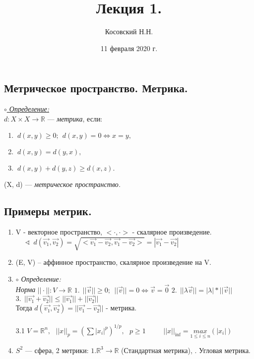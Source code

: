 \documentclass{article}
\title{Лекция 1.}
\author{Косовский Н.Н.}
\date{11 февраля 2020 г.}
\begin{document}
 \begin{spacing}{1.5}
\maketitle
\newpage
     
    \tableofcontents
    \newpage
\section{Метрическое пространство. Метрика.}
\underline{\textit{$\circ$ Определение:}}\\

  $d: X \times X\rightarrow \mathbb{R}$ --- \emph{\textit{метрика}}, если:
 \begin{enumerate}
\item $~d\left( x, y\right)\geq 0;~~ d\left( x, y\right) = 0\Longleftrightarrow x=y ,$
\item $~d\left( x, y\right)=d\left( y, x\right) ,$
\item $~d\left( x, y\right)+d\left( y, z\right)\geq d(x, z) .$

\end{enumerate}
 (X, d) --- \textit{метрическое пространство.}
 \\
 \subsection{Примеры метрик.}

 \begin{enumerate}
\item V - векторное пространство, $<\cdot , \cdot >$ - скалярное произведение.
 \\$ ~~~~~~\sphericalangle ~~d(\vec{v_{1}}, \vec{v_{2}}) = \sqrt{<\vec{v_{1}} - \vec{v_{2}},\vec{v_{1}} - \vec{v_{2}}> } = |\vec{v_{1}} - \vec{v_{2}}|$
 \item (E, V) -- аффинное пространство, скалярное произведение на V.
 \item \emph{$\circ$ Определение:}\\
 \emph{Норма }$||\cdot||: V\rightarrow  \mathbb{R}$
 \subitem $1. ~~||\vec{v}||\geq 0 ; ~~||\vec{v}|| = 0 \Longleftrightarrow \vec{v} = \vec{0} $
 \subitem $ 2. ~~||\lambda\vec{v}|| = |\lambda|*||\vec{v}|| $
 \subitem $ 3.~~||\vec{v_{1}} + \vec{v_{2}} ||\leq || \vec{v_{1}} || + ||\vec{v_{2}}||$
 \\Тогда $d(\vec{v_{1}}, \vec{v_{2}}) = ||\vec{v_{1}} - \vec{v_{2}}||$ - метрика.
 \\ \\3.1 $V = \mathbb{R}^{n} ,~~~ ||x||_{p} = (\sum |x_{i}|^{p})^{1/p},~~~ p\geq 1$
 \subsubitem $~~~~~~~~~~||x||_{\inf}=\underset{1\leq i\leq n}{max}(|x_{i}|)$
 \item $S^{2}$ --- сфера, 2 метрики:
 \subsubitem $1. \mathbb{R}^{3}\rightarrow \mathbb{R}$ (Стандартная метрика),
 . Угловая метрика.
\end{enumerate}
\end{spacing}
\end{document}
